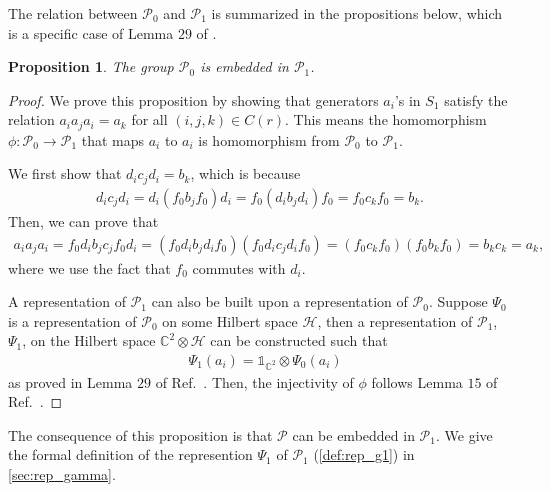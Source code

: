 \documentclass[11pt,letterpaper]{article}
\newcommand{\x}{\otimes}
\newcommand{\C}{\mathbb{C}}
\newcommand{\calH}{\mathcal{H}}
\newcommand{\1}{\mathbb{1}}
\newcommand{\Pg}{\mathcal{P}}
\newtheorem{proposition}[theorem]{Proposition}
\theoremstyle{definition}
\begin{document}
The relation between $\Pg_0$ and $\Pg_1$ is summarized in the propositions below, which 
is a specific case of Lemma $29$ of \cite{slofstra2017}.
\begin{proposition}
    \label{prop:g0g1}
	The group $\Pg_0$ is embedded in $\Pg_1$. 
\end{proposition}
\begin{proof}
    We prove this proposition by showing that generators $a_i$'s in $S_1$
    satisfy the relation $a_i a_j a_i = a_k$ for all $(i,j,k) \in C(r)$.
    This means the homomorphism $\phi: \Pg_0 \rightarrow \Pg_1$ that maps $a_i$
    to $a_i$ is homomorphism from $\Pg_0$ to $\Pg_1$. 
   
	We first show that $d_i c_j d_i = b_k$, which is because
	\begin{align*}
		d_i c_j d_i = d_i (f_0 b_j f_0) d_i = f_0 (d_i b_j d_i) f_0 = f_0 c_k f_0 = b_k.
	\end{align*}
	Then, we can prove that 
	\begin{align*}
		a_i a_j a_i = f_0 d_i b_j c_j f_0 d_i 
		= (f_0 d_i b_j d_i f_0)(f_0 d_i c_j d_i f_0) 
		= (f_0 c_k f_0)(f_0 b_k f_0) 
		= b_k c_k = a_k,
	\end{align*}
	where we use the fact that $f_0$ commutes with $d_i$.
	
	A representation of $\Pg_1$ can also be built upon a representation of $\Pg_0$.
    Suppose $\Psi_0$ is a representation of $\Pg_0$ on some Hilbert space $\calH$, then 
    a representation of $\Pg_1$, $\Psi_1$, on the Hilbert space $\C^2 \x \calH$ can
    be constructed such that
    \begin{align*}
        &\Psi_1(a_i) = \1_{\C^2} \x \Psi_0(a_i)
    \end{align*}
    as proved in Lemma $29$ of Ref.~\cite{slofstra2017}.
    Then, the injectivity of $\phi$ follows Lemma $15$ of Ref.~\cite{slofstra2017}.
\end{proof}
The consequence of this proposition is that $\Pg$ can be embedded in $\Pg_1$.
We give the formal definition of the represention $\Psi_1$ of $\Pg_1$ 
(\cref{def:rep_g1}) in \cref{sec:rep_gamma}.



\end{document}
